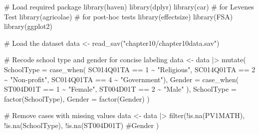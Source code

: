 \documentclass[
  letterpaper,
  DIV=11,
  numbers=noendperiod]{scrreprt}
\newenvironment{Shaded}{\begin{snugshade}}{\end{snugshade}}
\newcommand{\AttributeTok}[1]{\textcolor[rgb]{0.40,0.45,0.13}{#1}}
\newcommand{\CommentTok}[1]{\textcolor[rgb]{0.37,0.37,0.37}{#1}}
\newcommand{\DecValTok}[1]{\textcolor[rgb]{0.68,0.00,0.00}{#1}}
\newcommand{\FunctionTok}[1]{\textcolor[rgb]{0.28,0.35,0.67}{#1}}
\newcommand{\NormalTok}[1]{\textcolor[rgb]{0.00,0.23,0.31}{#1}}
\newcommand{\OtherTok}[1]{\textcolor[rgb]{0.00,0.23,0.31}{#1}}
\newcommand{\SpecialCharTok}[1]{\textcolor[rgb]{0.37,0.37,0.37}{#1}}
\newcommand{\StringTok}[1]{\textcolor[rgb]{0.13,0.47,0.30}{#1}}
\begin{document}
\begin{Shaded}
\begin{Highlighting}[]
\CommentTok{\# Load required package }
\FunctionTok{library}\NormalTok{(haven) }
\FunctionTok{library}\NormalTok{(dplyr) }
\FunctionTok{library}\NormalTok{(car)        }\CommentTok{\# for Levene\textquotesingle{}s Test }
\FunctionTok{library}\NormalTok{(agricolae) }\CommentTok{\# for post{-}hoc tests }
\FunctionTok{library}\NormalTok{(effectsize) }
\FunctionTok{library}\NormalTok{(FSA)  }
\FunctionTok{library}\NormalTok{(ggplot2) }
 
\CommentTok{\# Load the dataset }
\NormalTok{data }\OtherTok{\textless{}{-}} \FunctionTok{read\_sav}\NormalTok{(}\StringTok{"chapter10/chapter10data.sav"}\NormalTok{) }
 
\CommentTok{\# Recode school type and gender for concise labeling }
\NormalTok{data }\OtherTok{\textless{}{-}}\NormalTok{ data }\SpecialCharTok{|\textgreater{}} 
  \FunctionTok{mutate}\NormalTok{( }
    \AttributeTok{SchoolType =} \FunctionTok{case\_when}\NormalTok{( }
\NormalTok{    SC014Q01TA }\SpecialCharTok{==} \DecValTok{1} \SpecialCharTok{\textasciitilde{}} \StringTok{"Religious"}\NormalTok{, }
\NormalTok{    SC014Q01TA }\SpecialCharTok{==} \DecValTok{2} \SpecialCharTok{\textasciitilde{}} \StringTok{"Non{-}profit"}\NormalTok{, }
\NormalTok{    SC014Q01TA }\SpecialCharTok{==} \DecValTok{4} \SpecialCharTok{\textasciitilde{}} \StringTok{"Government"}\NormalTok{), }
    \AttributeTok{Gender =} \FunctionTok{case\_when}\NormalTok{( }
\NormalTok{      ST004D01T }\SpecialCharTok{==} \DecValTok{1} \SpecialCharTok{\textasciitilde{}} \StringTok{"Female"}\NormalTok{, }
\NormalTok{      ST004D01T }\SpecialCharTok{==} \DecValTok{2} \SpecialCharTok{\textasciitilde{}} \StringTok{"Male"} 
\NormalTok{      ), }
    \AttributeTok{SchoolType =} \FunctionTok{factor}\NormalTok{(SchoolType), }
    \AttributeTok{Gender =} \FunctionTok{factor}\NormalTok{(Gender) }
\NormalTok{    ) }
 
\CommentTok{\# Remove cases with missing values }
\NormalTok{data }\OtherTok{\textless{}{-}}\NormalTok{ data }\SpecialCharTok{|\textgreater{}} 
  \FunctionTok{filter}\NormalTok{(}\SpecialCharTok{!}\FunctionTok{is.na}\NormalTok{(PV1MATH), }\SpecialCharTok{!}\FunctionTok{is.na}\NormalTok{(SchoolType),  }
         \SpecialCharTok{!}\FunctionTok{is.na}\NormalTok{(ST004D01T) }\CommentTok{\#Gender }
\NormalTok{         ) }
\end{Highlighting}
\end{Shaded}
\end{document}
